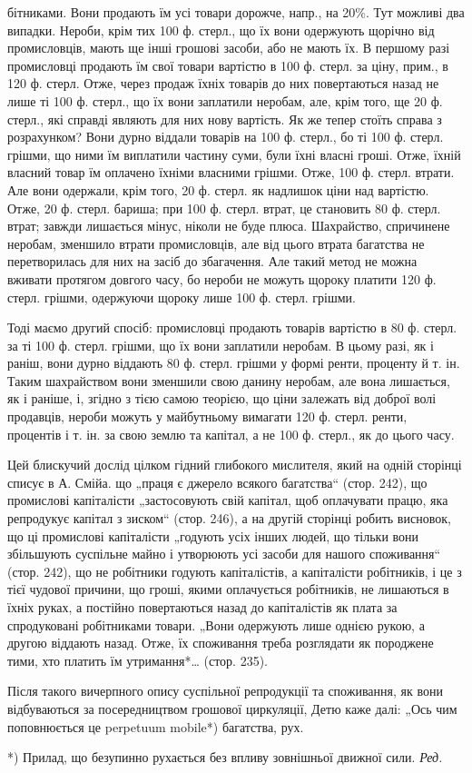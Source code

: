 \parcont{}  %
бітниками. Вони продають їм усі товари дорожче, напр., на 20\%. Тут можливі два випадки. Нероби, крім
тих 100 ф. стерл., що їх вони одержують щорічно від промисловців, мають ще інші грошові засоби, або
не мають їх. В першому разі промисловці продають їм свої товари вартістю в 100 ф. стерл. за ціну,
прим., в 120 ф. стерл. Отже, через продаж їхніх товарів до них повертаються назад не лише ті 100 ф.
стерл., що їх вони заплатили неробам, але, крім того, ще 20 ф. стерл., які справді являють для них
нову вартість. Як же тепер стоїть справа з розрахунком? Вони дурно віддали товарів на 100 ф. стерл.,
бо ті 100 ф. стерл. грішми, що ними їм виплатили частину суми, були їхні власні гроші. Отже, їхній
власний товар їм оплачено їхніми власними грішми. Отже, 100 ф. стерл. втрати. Але вони одержали,
крім того, 20 ф. стерл. як надлишок ціни над вартістю. Отже, 20 ф. стерл. бариша; при 100 ф. стерл.
втрат, це становить 80 ф. стерл. втрат; завжди лишається мінус, ніколи не буде плюса. Шахрайство,
спричинене неробам, зменшило втрати промисловців, але від цього втрата багатства не перетворилась
для них на засіб до збагачення. Але такий метод не можна вживати протягом довгого часу, бо нероби не
можуть щороку платити 120 ф. стерл. грішми, одержуючи щороку лише 100 ф. стерл. грішми.

Тоді маємо другий спосіб: промисловці продають товарів вартістю в 80 ф. стерл. за ті 100 ф. стерл.
грішми, що їх вони заплатили неробам. В цьому разі, як і раніш, вони дурно віддають 80 ф. стерл.
грішми у формі ренти, проценту й т. ін. Таким шахрайством вони зменшили свою данину неробам, але
вона лишається, як і раніше, і, згідно з тією самою теорією, що ціни залежать від доброї волі
продавців, нероби можуть у майбутньому вимагати 120 ф. стерл. ренти, процентів і т. ін. за свою
землю та капітал, а не 100 ф. стерл., як до цього часу.

Цей блискучий дослід цілком гідний глибокого мислителя, який на одній сторінці списує в А. Смійа. що
„праця є джерело всякого багатства“ (стор. 242), що промислові капіталісти „застосовують свій
капітал, щоб оплачувати працю, яка репродукує капітал з зиском“ (стор. 246), а на другій сторінці
робить висновок, що ці промислові капіталісти „годують
усіх інших людей, що тільки вони збільшують суспільне майно і утворюють усі засоби для нашого
споживання“ (стор. 242), що не робітники годують капіталістів, а капіталісти робітників, і це з тієї
чудової причини, що гроші, якими оплачується робітників, не лишаються в їхніх руках, а постійно
повертаються назад до капіталістів як плата за спродуковані робітниками товари. „Вони одержують лише
однією рукою, а другою віддають назад. Отже, їх споживання треба розглядати як породжене тими, хто
платить їм утримання*\dots{} (стор. 235).

Після такого вичерпного опису суспільної репродукції та споживання, як вони відбуваються за
посередництвом грошової циркуляції, Детю каже далі: „Ось чим поповнюється це perpetuum mobile*)
багатства, рух.

*) Прилад, що безупинно рухається без впливу зовнішньої движної сили. \emph{Ред.}
\parbreak{}  %

